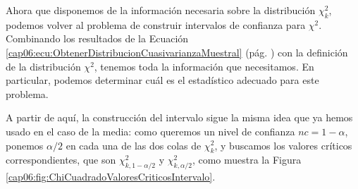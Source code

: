 Ahora que disponemos de la información necesaria sobre la distribución
$\chi^2_k$, podemos volver al problema de construir intervalos de confianza
para $\chi^2$. Combinando los resultados de la Ecuación
\ref{cap06:ecu:ObtenerDistribucionCuasivarianzaMuestral} (pág.
\pageref{cap06:ecu:ObtenerDistribucionCuasivarianzaMuestral}) con la definición
de la distribución $\chi^2$, tenemos toda la información que necesitamos. En
particular, podemos determinar cuál es el estadístico adecuado para este
problema.
    \begin{center}
   \end{center}
A partir de aquí, la construcción del intervalo sigue la misma idea que ya
hemos usado en el caso de la media: como queremos un nivel de confianza
$nc=1-\alpha$, ponemos $\alpha/2$ en cada una de las dos colas de $\chi^2_k$, y
buscamos los valores críticos correspondientes, que son $\chi^2_{k,1-\alpha/2}$
y $\chi^2_{k,\alpha/2}$, como muestra la Figura
\ref{cap06:fig:ChiCuadradoValoresCriticosIntervalo}.

